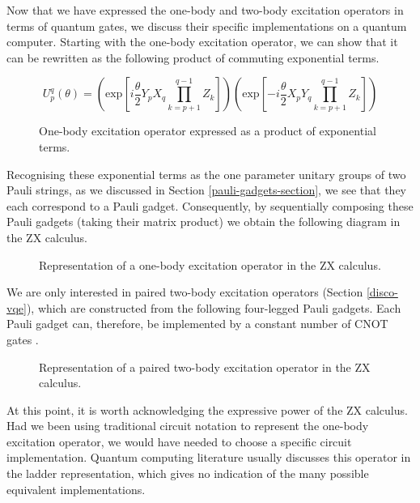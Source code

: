 Now that we have expressed the one-body and two-body excitation operators in terms of quantum gates, we discuss their specific implementations on a quantum computer. Starting with the one-body excitation operator, we can show that it can be rewritten as the following product of commuting exponential terms.

\begin{figure}[H]
    \centering
    \begin{equation*}
        U^q_p (\theta) =
        \left( \text{exp} \left[
        i \frac{\theta}{2} Y_p X_q \prod_{k=p+1}^{q-1} Z_k \right] \right)
        \left( \text{exp} \left[ -
        i \frac{\theta}{2} X_p Y_q \prod_{k=p+1}^{q-1} Z_k \right] \right)
    \end{equation*}
    \caption{One-body excitation operator expressed as a product of exponential terms.}
\end{figure}
\vspace{-10pt}

Recognising these exponential terms as the one parameter unitary groups of two Pauli strings, as we discussed in Section \ref{pauli-gadgets-section}, we see that they each correspond to a Pauli gadget. Consequently, by sequentially composing these Pauli gadgets (taking their matrix product) we obtain the following diagram in the ZX calculus. 

\begin{figure}[H]
    \centering
    \caption{Representation of a one-body excitation operator in the ZX calculus.}
\end{figure}

We are only interested in paired two-body excitation operators (Section \ref{disco-vqe}), which are constructed from the following four-legged Pauli gadgets. Each Pauli gadget can, therefore, be implemented by a constant number of CNOT gates \cite{Burton2023}.

\begin{figure}[H]
    \centering
    \caption{Representation of a paired two-body excitation operator in the ZX calculus.}
\end{figure}

At this point, it is worth acknowledging the expressive power of the ZX calculus. Had we been using traditional circuit notation to represent the one-body excitation operator, we would have needed to choose a specific circuit implementation. Quantum computing literature usually discusses this operator in the ladder representation, which gives no indication of the many possible equivalent implementations.

